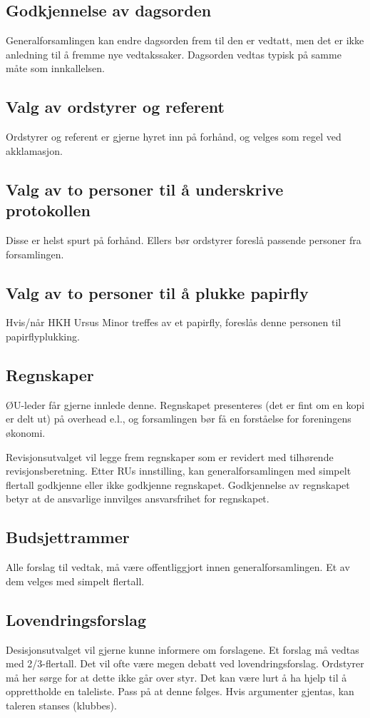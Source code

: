 \subsection{Godkjennelse av dagsorden}
Generalforsamlingen kan endre dagsorden frem til den er vedtatt, men det er ikke anledning til å
fremme nye vedtakssaker. Dagsorden vedtas typisk på samme måte som innkallelsen.

\subsection{Valg av ordstyrer og referent}
Ordstyrer og referent er gjerne hyret inn på forhånd, og velges som regel ved akklamasjon.

\subsection{Valg av to personer til å underskrive protokollen}
Disse er helst spurt på forhånd. Ellers bør ordstyrer foreslå passende personer fra forsamlingen.

\subsection{Valg av to personer til å plukke papirfly}
Hvis/når HKH Ursus Minor treffes av et papirfly, foreslås denne personen til papirflyplukking.

\subsection{Regnskaper}
ØU-leder får gjerne innlede denne. Regnskapet presenteres (det er fint om en kopi er delt ut) på overhead e.l.,
og forsamlingen bør få en forståelse for foreningens økonomi.

Revisjonsutvalget vil legge frem regnskaper som er revidert med tilhørende revisjonsberetning. Etter
RUs innstilling, kan generalforsamlingen med simpelt flertall godkjenne eller ikke godkjenne regnskapet.
Godkjennelse av regnskapet betyr at de ansvarlige innvilges ansvarsfrihet for regnskapet.

\subsection{Budsjettrammer}
Alle forslag til vedtak, må være offentliggjort innen generalforsamlingen. Et av dem velges med simpelt 
flertall.

\subsection{Lovendringsforslag}
Desisjonsutvalget vil gjerne kunne informere om forslagene. Et forslag må vedtas med 2/3-flertall.
Det vil ofte være megen debatt ved lovendringsforslag. Ordstyrer må her sørge for at dette ikke går over
styr. Det kan være lurt å ha hjelp til å opprettholde en taleliste. Pass på at denne følges. Hvis 
argumenter gjentas, kan taleren stanses (klubbes).

